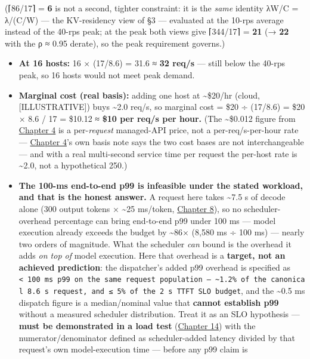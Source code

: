 (⌈86/17⌉ = \textbf{6} is not a second, tighter constraint: it is the
\emph{same} identity λW/C = λ/(C/W) --- the KV-residency view of §3 ---
evaluated at the 10-rps average instead of the 40-rps peak; at the peak
both views give ⌈344/17⌉ = \textbf{21} (→ \textbf{22} with the ρ ≈ 0.95
derate), so the peak requirement governs.)

\begin{itemize}
\tightlist
\item
  \textbf{At 16 hosts:} 16 × (17/8.6) = 31.6 ≈ \textbf{32 req/s} ---
  still below the 40-rps peak, so 16 hosts would not meet peak demand.
\item
  \textbf{Marginal cost (real basis):} adding one host at
  \textasciitilde\$20/hr (cloud, \mbox{{[}ILLUSTRATIVE{]}}) buys
  \textasciitilde2.0 req/s, so marginal cost = \$20 ÷ (17/8.6) = \$20 ×
  8.6 / 17 = \$10.12 ≈ \textbf{\$10 per req/s per hour.} (The
  \textasciitilde\$0.012 figure from \hyperref[chap:4]{Chapter 4} is a per-\emph{request}
  managed-API price, not a per-req/s-per-hour rate --- \hyperref[chap:4]{Chapter 4}'s own
  basis note says the two cost bases are not interchangeable --- and
  with a real multi-second service time per request the per-host rate is
  \textasciitilde2.0, not a hypothetical 250.)
\item
  \textbf{The 100-ms end-to-end p99 is infeasible under the stated
  workload, and that is the honest answer.} A request here takes
  \textasciitilde7.5 s of decode alone (300 output tokens ×
  \textasciitilde25 ms/token, \hyperref[chap:8]{Chapter 8}), so no scheduler-overhead
  percentage can bring end-to-end p99 under 100 ms --- model execution
  already exceeds the budget by \textasciitilde86× (8,580 ms ÷ 100 ms)
  --- nearly two orders of magnitude. What the scheduler \emph{can}
  bound is the overhead it adds \emph{on top of} model execution. Here
  that overhead is a \textbf{target, not an achieved prediction}: the
  dispatcher's added p99 overhead is specified as
  \texttt{\textless{}\ 100\ ms\ p99\ on\ the\ same\ request\ population\ —\ \textasciitilde{}1.2\%\ of\ the\ canonical\ 8.6\ s\ request,\ and\ ≤\ 5\%\ of\ the\ 2\ s\ TTFT\ SLO\ budget},
  and the \textasciitilde0.5 ms dispatch figure is a median/nominal
  value that \textbf{cannot establish p99} without a measured scheduler
  distribution. Treat it as an SLO hypothesis --- \textbf{must be
  demonstrated in a load test} (\hyperref[chap:14]{Chapter 14}) with the
  numerator/denominator defined as scheduler-added latency divided by
  that request's own model-execution time --- before any p99 claim is

\end{itemize}
